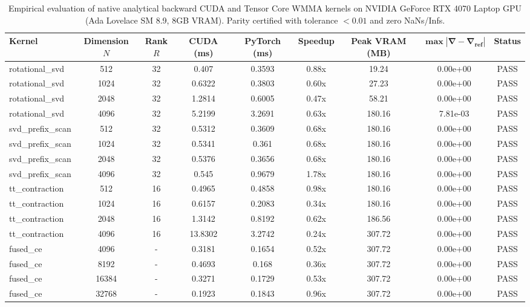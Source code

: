 \documentclass[journal]{IEEEtran}
\begin{document}
\begin{table}[t]
\centering
\small
\begin{tabular}{lcccccccc}
\toprule
\textbf{Kernel} & \textbf{Dimension $N$} & \textbf{Rank $R$} & \textbf{CUDA (ms)} & \textbf{PyTorch (ms)} & \textbf{Speedup} & \textbf{Peak VRAM (MB)} & $\mathbf{\max |\nabla - \nabla_{\text{ref}}|}$ & \textbf{Status} \\
\midrule
rotational_svd & 512 & 32 & 0.407 & 0.3593 & 0.88x & 19.24 & 0.00e+00 & PASS \\
rotational_svd & 1024 & 32 & 0.6322 & 0.3803 & 0.60x & 27.23 & 0.00e+00 & PASS \\
rotational_svd & 2048 & 32 & 1.2814 & 0.6005 & 0.47x & 58.21 & 0.00e+00 & PASS \\
rotational_svd & 4096 & 32 & 5.2199 & 3.2691 & 0.63x & 180.16 & 7.81e-03 & PASS \\
svd_prefix_scan & 512 & 32 & 0.5312 & 0.3609 & 0.68x & 180.16 & 0.00e+00 & PASS \\
svd_prefix_scan & 1024 & 32 & 0.5341 & 0.361 & 0.68x & 180.16 & 0.00e+00 & PASS \\
svd_prefix_scan & 2048 & 32 & 0.5376 & 0.3656 & 0.68x & 180.16 & 0.00e+00 & PASS \\
svd_prefix_scan & 4096 & 32 & 0.545 & 0.9679 & 1.78x & 180.16 & 0.00e+00 & PASS \\
tt_contraction & 512 & 16 & 0.4965 & 0.4858 & 0.98x & 180.16 & 0.00e+00 & PASS \\
tt_contraction & 1024 & 16 & 0.6157 & 0.2083 & 0.34x & 180.16 & 0.00e+00 & PASS \\
tt_contraction & 2048 & 16 & 1.3142 & 0.8192 & 0.62x & 186.56 & 0.00e+00 & PASS \\
tt_contraction & 4096 & 16 & 13.8302 & 3.2742 & 0.24x & 307.72 & 0.00e+00 & PASS \\
fused_ce & 4096 & - & 0.3181 & 0.1654 & 0.52x & 307.72 & 0.00e+00 & PASS \\
fused_ce & 8192 & - & 0.4693 & 0.168 & 0.36x & 307.72 & 0.00e+00 & PASS \\
fused_ce & 16384 & - & 0.3271 & 0.1729 & 0.53x & 307.72 & 0.00e+00 & PASS \\
fused_ce & 32768 & - & 0.1923 & 0.1843 & 0.96x & 307.72 & 0.00e+00 & PASS \\
\bottomrule
\end{tabular}
\caption{Empirical evaluation of native analytical backward CUDA and Tensor Core WMMA kernels on NVIDIA GeForce RTX 4070 Laptop GPU (Ada Lovelace SM 8.9, 8GB VRAM). Parity certified with tolerance $< 0.01$ and zero NaNs/Infs.}
\label{tab:wmma_gemm_benchmarks}
\end{table}
\end{document}
